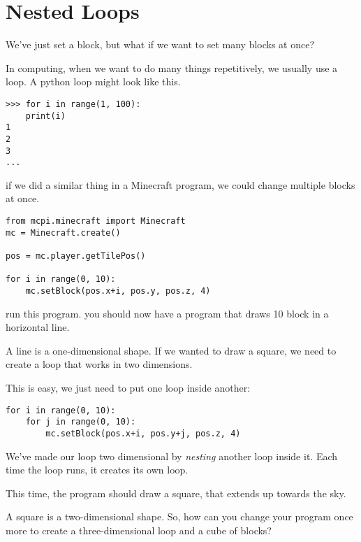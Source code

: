 \section{Nested Loops} \label{sec:loops}

We've just set a block, but what if we want to set many blocks at once?

In computing, when we want to do many things repetitively, we usually use a loop. A python loop might look like this.

\begin{lstlisting}[style=Terminal, numbers=none]
>>> for i in range(1, 100):
	print(i)
1
2
3
...
\end{lstlisting}

if we did a similar thing in a Minecraft program, we could change multiple blocks at once.

\begin{lstlisting}[style=Python, title=minecraftloop.py, breaklines=true]
from mcpi.minecraft import Minecraft
mc = Minecraft.create()

pos = mc.player.getTilePos()

for i in range(0, 10):
	mc.setBlock(pos.x+i, pos.y, pos.z, 4)
\end{lstlisting}

run this program. you should now have a program that draws 10 block in a horizontal line.

A line is a one-dimensional shape. If we wanted to draw a square, we need to create a loop that works in two dimensions.

This is easy, we just need to put one loop inside another:
\begin{lstlisting}[style=Python, title=minecraftloop.py, breaklines=true, firstnumber=6]
for i in range(0, 10):
	for j in range(0, 10):
		mc.setBlock(pos.x+i, pos.y+j, pos.z, 4)
\end{lstlisting}

We've made our loop two dimensional by \textit{nesting} another loop inside it. Each time the loop runs, it creates its own loop.

This time, the program should draw a square, that extends up towards the sky.

A square is a two-dimensional shape. So, how can you change your program once more to create a three-dimensional loop and a cube of blocks?